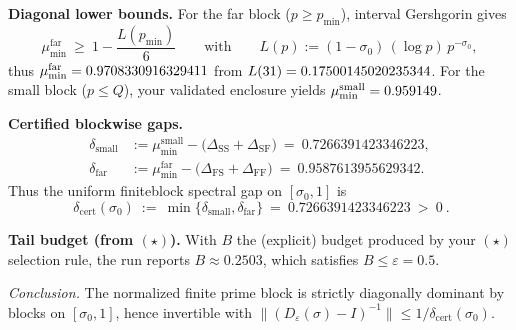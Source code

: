 \medskip
\noindent\textbf{Diagonal lower bounds.}
For the far block ($p\ge p_{\min}$), interval Gershgorin gives
\[
\mu_{\min}^{\mathrm{far}}
\ \ge\
1-\frac{L(p_{\min})}{6}
\qquad\text{with}\qquad
L(p):=(1-\sigma_0)\,(\log p)\,p^{-\sigma_0},
\]
thus $\mu_{\min}^{\mathrm{far}}=0.9708330916329411$ from $L(31)=0.17500145020235344$.
For the small block ($p\le Q$), your validated enclosure yields
$\mu_{\min}^{\mathrm{small}}=0.959149$.

\medskip
\noindent\textbf{Certified blockwise gaps.}
\[
\begin{aligned}
\delta_{\mathrm{small}}
&:= \mu_{\min}^{\mathrm{small}} - \big(\Delta_{\mathrm{SS}}+\Delta_{\mathrm{SF}}\big)
\ =\ \mathbf{0.7266391423346223},\\
\delta_{\mathrm{far}}
&:= \mu_{\min}^{\mathrm{far}} - \big(\Delta_{\mathrm{FS}}+\Delta_{\mathrm{FF}}\big)
\ =\ \mathbf{0.9587613955629342}.
\end{aligned}
\]
Thus the uniform finite\-block spectral gap on $[\sigma_0,1]$ is
\[
\boxed{\ \delta_{\mathrm{cert}}(\sigma_0)\ :=\ \min\{\delta_{\mathrm{small}},\delta_{\mathrm{far}}\}
\ =\ \mathbf{0.7266391423346223}\ >\ 0\ }.
\]

\medskip
\noindent\textbf{Tail budget (from $(\star)$).}
With $B$ the (explicit) budget produced by your $(\star)$ selection rule,
the run reports $B\approx\mathbf{0.2503}$, which satisfies $B\le \varepsilon=\mathbf{0.5}$.

\medskip
\noindent\emph{Conclusion.}
The normalized finite prime block is strictly diagonally dominant by blocks on $[\sigma_0,1]$,
hence invertible with $\|(D_{\varepsilon}(\sigma)-I)^{-1}\|\le 1/\delta_{\mathrm{cert}}(\sigma_0)$.
\par\endgroup
